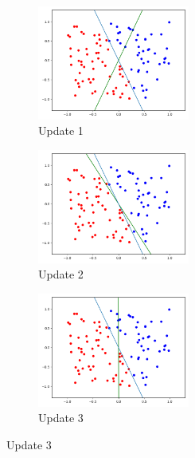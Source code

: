 \documentclass[12pt,letterpaper]{article}
\begin{document}
\begin{enumerate}[leftmargin=!,labelindent=5pt]
        \begin{figure}[H]
        \begin{subfigure}{0.3\textwidth}
        \includegraphics[width=5cm]{images/c1.png} 
        \caption{Update 1}
        \label{fig:subim4}
        \end{subfigure}
        \begin{subfigure}{0.3\textwidth}
        \includegraphics[width=5cm]{images/c2.png}
        \caption{Update 2}
        \label{fig:subim5}
        \end{subfigure}
        \begin{subfigure}{0.3\textwidth}
        \includegraphics[width=5cm]{images/c3.png}
        \caption{Update 3}
        \label{fig:subim6}
        \end{subfigure}
        \end{figure}
        

\end{enumerate}
\end{document}
